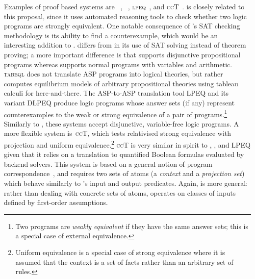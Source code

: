 Examples of proof based systems are \selp~\cite{chenlinli05}, \tabeql~\cite{val04}, \textsc{lpeq}~\cite{janoik04}, and \textsc{ccT}~\cite{oetseitomwol09}.
\selp is closely related to this proposal, since it uses automated reasoning tools to check whether two logic programs are strongly equivalent.
One notable consequence of \selp's SAT checking methodology is its ability to find a counterexample, which would be an interesting addition to \anthem.
\selp differs from \anthem in its use of SAT solving instead of theorem proving; a more important difference is that \selp supports disjunctive propositional programs whereas \anthem supports normal programs with variables and arithmetic.
%
\textsc{tabeql} does not translate ASP programs into logical theories, but rather computes equilibrium models of arbitrary propositional theories using tableau calculi for here-and-there.
%
The ASP-to-ASP translation tool \textsc{LPEQ} and its variant \textsc{DLPEQ} produce logic programs whose answer sets (if any) represent counterexamples to the weak or strong equivalence of a pair of programs.\footnote{Two programs are \emph{weakly equivalent} if they have the same answer sets; this is a special case of external equivalence.}
Similarly to \selp, these systems accept disjunctive, variable-free logic programs.
A more flexible system is~\textsc{ccT}, which tests relativised strong equivalence with projection and uniform equivalence.\footnote{Uniform equivalence is a special case of strong equivalence where it is assumed that the context is a set of facts rather than an arbitrary set of rules.}
\textsc{ccT} is very similar in spirit to \anthem, \selp, and \textsc{LPEQ} given that it relies on a translation to quantified Boolean formulas evaluated by backend solvers.
This system is based on a general notion of program correspondence~\cite{eittomwol05}, and requires two sets of atoms (a \emph{context} and a \emph{projection set}) which behave similarly to \anthem's input and output predicates.
Again, \anthem is more general: rather than dealing with concrete sets of atoms, \anthem operates on classes of inputs defined by first-order assumptions.



